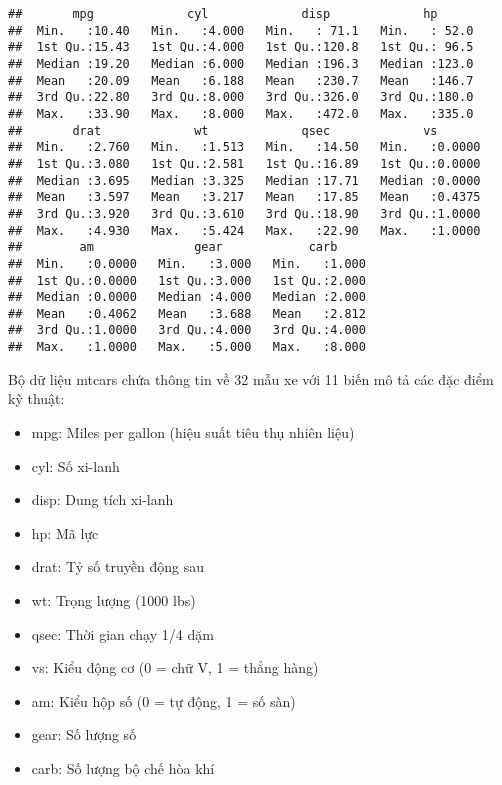 \documentclass[
]{article}
\begin{document}
\begin{verbatim}
##       mpg             cyl             disp             hp       
##  Min.   :10.40   Min.   :4.000   Min.   : 71.1   Min.   : 52.0  
##  1st Qu.:15.43   1st Qu.:4.000   1st Qu.:120.8   1st Qu.: 96.5  
##  Median :19.20   Median :6.000   Median :196.3   Median :123.0  
##  Mean   :20.09   Mean   :6.188   Mean   :230.7   Mean   :146.7  
##  3rd Qu.:22.80   3rd Qu.:8.000   3rd Qu.:326.0   3rd Qu.:180.0  
##  Max.   :33.90   Max.   :8.000   Max.   :472.0   Max.   :335.0  
##       drat             wt             qsec             vs        
##  Min.   :2.760   Min.   :1.513   Min.   :14.50   Min.   :0.0000  
##  1st Qu.:3.080   1st Qu.:2.581   1st Qu.:16.89   1st Qu.:0.0000  
##  Median :3.695   Median :3.325   Median :17.71   Median :0.0000  
##  Mean   :3.597   Mean   :3.217   Mean   :17.85   Mean   :0.4375  
##  3rd Qu.:3.920   3rd Qu.:3.610   3rd Qu.:18.90   3rd Qu.:1.0000  
##  Max.   :4.930   Max.   :5.424   Max.   :22.90   Max.   :1.0000  
##        am              gear            carb      
##  Min.   :0.0000   Min.   :3.000   Min.   :1.000  
##  1st Qu.:0.0000   1st Qu.:3.000   1st Qu.:2.000  
##  Median :0.0000   Median :4.000   Median :2.000  
##  Mean   :0.4062   Mean   :3.688   Mean   :2.812  
##  3rd Qu.:1.0000   3rd Qu.:4.000   3rd Qu.:4.000  
##  Max.   :1.0000   Max.   :5.000   Max.   :8.000
\end{verbatim}

Bộ dữ liệu mtcars chứa thông tin về 32 mẫu xe với 11 biến mô tả các đặc
điểm kỹ thuật:

\begin{itemize}
\item
  mpg: Miles per gallon (hiệu suất tiêu thụ nhiên liệu)
\item
  cyl: Số xi-lanh
\item
  disp: Dung tích xi-lanh
\item
  hp: Mã lực
\item
  drat: Tỷ số truyền động sau
\item
  wt: Trọng lượng (1000 lbs)
\item
  qsec: Thời gian chạy 1/4 dặm
\item
  vs: Kiểu động cơ (0 = chữ V, 1 = thẳng hàng)
\item
  am: Kiểu hộp số (0 = tự động, 1 = số sàn)
\item
  gear: Số lượng số
\item
  carb: Số lượng bộ chế hòa khí
\end{itemize}
\end{document}

